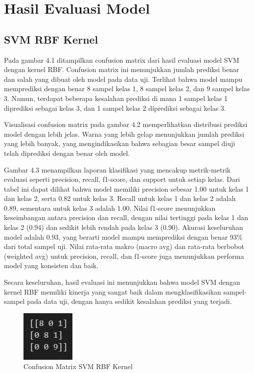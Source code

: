 \section{Hasil Evaluasi Model}
\label{sec:HasilEvaluasiModel}

\subsection{SVM RBF Kernel}
\label{subsec:evalSVMRBF}

Pada gambar 4.1 ditampilkan confusion matrix dari hasil evaluasi model SVM dengan kernel RBF. Confusion matrix ini menunjukkan jumlah prediksi benar dan salah yang dibuat oleh model pada data uji. Terlihat bahwa model mampu memprediksi dengan benar 8 sampel kelas 1, 8 sampel kelas 2, dan 9 sampel kelas 3. Namun, terdapat beberapa kesalahan prediksi di mana 1 sampel kelas 1 diprediksi sebagai kelas 3, dan 1 sampel kelas 2 diprediksi sebagai kelas 3.

Visualisasi confusion matrix pada gambar 4.2 memperlihatkan distribusi prediksi model dengan lebih jelas. Warna yang lebih gelap menunjukkan jumlah prediksi yang lebih banyak, yang mengindikasikan bahwa sebagian besar sampel diuji telah diprediksi dengan benar oleh model.

Gambar 4.3 menampilkan laporan klasifikasi yang mencakup metrik-metrik evaluasi seperti precision, recall, f1-score, dan support untuk setiap kelas. Dari tabel ini dapat dilihat bahwa model memiliki precision sebesar 1.00 untuk kelas 1 dan kelas 2, serta 0.82 untuk kelas 3. Recall untuk kelas 1 dan kelas 2 adalah 0.89, sementara untuk kelas 3 adalah 1.00. Nilai f1-score menunjukkan keseimbangan antara precision dan recall, dengan nilai tertinggi pada kelas 1 dan kelas 2 (0.94) dan sedikit lebih rendah pada kelas 3 (0.90). Akurasi keseluruhan model adalah 0.93, yang berarti model mampu memprediksi dengan benar 93\% dari total sampel uji. Nilai rata-rata makro (macro avg) dan rata-rata berbobot (weighted avg) untuk precision, recall, dan f1-score juga menunjukkan performa model yang konsisten dan baik.

Secara keseluruhan, hasil evaluasi ini menunjukkan bahwa model SVM dengan kernel RBF memiliki kinerja yang sangat baik dalam mengklasifikasikan sampel-sampel pada data uji, dengan hanya sedikit kesalahan prediksi yang terjadi.

\begin{figure} [H] \centering
  \includegraphics[scale=1]{gambar/cfrbf.jpg}
  \caption{Confusion Matrix SVM RBF Kernel}
  \label{fig:evalconfRBF}
\end{figure}

